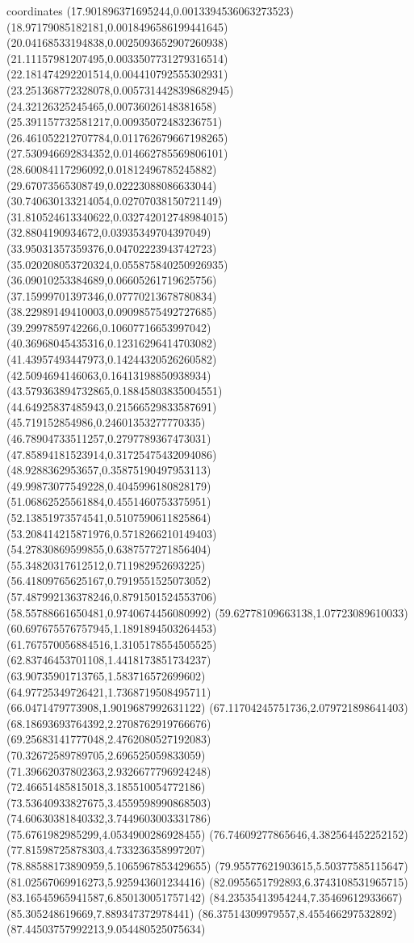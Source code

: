 coordinates {%
(17.901896371695244,0.0013394536063273523)
(18.97179085182181,0.0018496586199441645)
(20.04168533194838,0.0025093652907260938)
(21.11157981207495,0.0033507731279316514)
(22.181474292201514,0.004410792555302931)
(23.251368772328078,0.0057314428398682945)
(24.32126325245465,0.00736026148381658)
(25.391157732581217,0.00935072483236751)
(26.461052212707784,0.011762679667198265)
(27.530946692834352,0.014662785569806101)
(28.60084117296092,0.01812496785245882)
(29.67073565308749,0.02223088086633044)
(30.740630133214054,0.02707038150721149)
(31.810524613340622,0.032742012748984015)
(32.8804190934672,0.03935349704397049)
(33.95031357359376,0.04702223943742723)
(35.020208053720324,0.055875840250926935)
(36.09010253384689,0.06605261719625756)
(37.15999701397346,0.07770213678780834)
(38.22989149410003,0.09098575492727685)
(39.2997859742266,0.10607716653997042)
(40.36968045435316,0.12316296414703082)
(41.43957493447973,0.14244320526260582)
(42.5094694146063,0.16413198850938934)
(43.579363894732865,0.18845803835004551)
(44.64925837485943,0.21566529833587691)
(45.719152854986,0.24601353277770335)
(46.78904733511257,0.2797789367473031)
(47.85894181523914,0.31725475432094086)
(48.9288362953657,0.35875190497953113)
(49.99873077549228,0.4045996180828179)
(51.06862525561884,0.4551460753375951)
(52.13851973574541,0.5107590611825864)
(53.208414215871976,0.5718266210149403)
(54.27830869599855,0.6387577271856404)
(55.34820317612512,0.711982952693225)
(56.41809765625167,0.7919551525073052)
(57.487992136378246,0.8791501524553706)
(58.55788661650481,0.9740674456080992)
(59.62778109663138,1.07723089610033)
(60.697675576757945,1.1891894503264453)
(61.767570056884516,1.3105178554505525)
(62.83746453701108,1.4418173851734237)
(63.90735901713765,1.583716572699602)
(64.97725349726421,1.7368719508495711)
(66.0471479773908,1.9019687992631122)
(67.11704245751736,2.079721898641403)
(68.18693693764392,2.2708762919766676)
(69.25683141777048,2.4762080527192083)
(70.32672589789705,2.696525059833059)
(71.39662037802363,2.9326677796924248)
(72.46651485815018,3.185510054772186)
(73.53640933827675,3.4559598990868503)
(74.60630381840332,3.7449603003331786)
(75.6761982985299,4.0534900286928455)
(76.74609277865646,4.382564452252152)
(77.81598725878303,4.733236358997207)
(78.88588173890959,5.1065967853429655)
(79.95577621903615,5.50377585115647)
(81.02567069916273,5.925943601234416)
(82.0955651792893,6.3743108531965715)
(83.16545965941587,6.850130051757142)
(84.23535413954244,7.35469612933667)
(85.305248619669,7.889347372978441)
(86.37514309979557,8.455466297532892)
(87.44503757992213,9.054480525075634)
}
